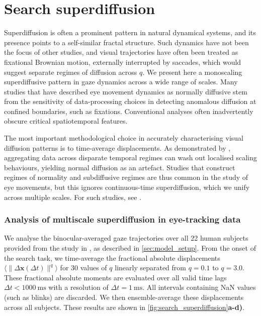 \section{Search superdiffusion}\label{sec:search_superdiffusion}
Superdiffusion is often a prominent pattern in natural dynamical systems, and its presence points to a self-similar fractal structure. Such dynamics have not been the focus of other studies, and visual trajectories have often been treated as fixational Brownian motion, externally interrupted by saccades, which would suggest separate regimes of diffusion across $q$. We present here a monoscaling superdiffusive pattern in gaze dynamics across a wide range of scales. Many studies that have described eye movement dynamics as normally diffusive stem from the sensitivity of data-processing choices in detecting anomalous diffusion at confined boundaries, such as fixations. Conventional analyses often inadvertently obscure critical spatiotemporal features.

The most important methodological choice in accurately characterising visual diffusion patterns is to time-average displacements. As demonstrated by \textcite{vilk_strong_2025}, aggregating data across disparate temporal regimes can wash out localised scaling behaviours, yielding normal diffusion as an artefact. Studies that construct regimes of normality and subdiffusive regimes are thus common in the study of eye movements, but this ignores continuous-time superdiffusion, which we unify across multiple scales. For such studies, see \cite{lencastre_dynamical_2025, leroux_random_2021, roberts_fixational_2013, collewijn_significance_2008}.

\subsubsection*{Analysis of multiscale superdiffusion in eye-tracking data}
We analyse the binocular-averaged gaze trajectories over all 22 human subjects provided from the study in \textcite{naher_primate_saccades}, as described in \cref{sec:model_setup}. From the onset of the search task, we time-average the fractional absolute displacements $\langle \|\Delta \textbf{x}(\Delta t) \|^q \rangle $ for 30 values of $q$ linearly separated from $q=0.1$ to $q=3.0$. These fractional absolute moments are evaluated over all valid time lags $\Delta t < \qty{1000}{\ms}$ with a resolution of $\Delta t = \qty{1}{\ms}$. All intervals containing NaN values (such as blinks) are discarded. We then ensemble-average these displacements across all subjects. These results are shown in \cref{fig:search_superdiffusion}\textbf{a-d)}.

